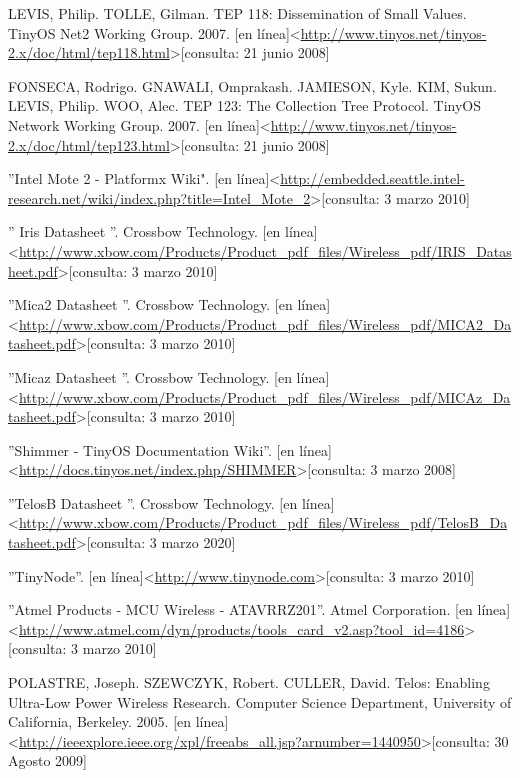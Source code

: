 \begin{thebibliography}{99}
\begin{sloppypar}
 LEVIS, Philip. TOLLE, Gilman. TEP 118: Dissemination of Small Values. TinyOS Net2 Working Group. 2007. 
[en línea]\textless \url{http://www.tinyos.net/tinyos-2.x/doc/html/tep118.html}\textgreater[consulta: 21 junio 2008] 

 FONSECA, Rodrigo. GNAWALI, Omprakash. JAMIESON, Kyle. KIM, Sukun. LEVIS, Philip. WOO, Alec. TEP 123: The Collection Tree Protocol. TinyOS Network Working Group. 2007. [en línea]\textless\url{http://www.tinyos.net/tinyos-2.x/doc/html/tep123.html}\textgreater[consulta: 21 junio 2008] 

 ''Intel Mote 2 - Platformx Wiki". [en línea]\textless\url{http://embedded.seattle.intel-research.net/wiki/index.php?title=Intel_Mote_2}\textgreater[consulta: 3 marzo 2010] 

 '' Iris Datasheet ''. Crossbow Technology. [en línea]\textless\url{http://www.xbow.com/Products/Product_pdf_files/Wireless_pdf/IRIS_Datasheet.pdf}\textgreater[consulta: 3 marzo 2010] 

 ''Mica2 Datasheet ''. Crossbow Technology.
[en línea]\textless\url{http://www.xbow.com/Products/Product_pdf_files/Wireless_pdf/MICA2_Datasheet.pdf}\textgreater[consulta: 3 marzo 2010] 

 ''Micaz Datasheet ''. Crossbow Technology.
[en línea]\textless\url{http://www.xbow.com/Products/Product_pdf_files/Wireless_pdf/MICAz_Datasheet.pdf}\textgreater[consulta: 3 marzo 2010] 

 ''Shimmer - TinyOS Documentation Wiki''.
[en línea]\textless\url{http://docs.tinyos.net/index.php/SHIMMER}\textgreater[consulta: 3 marzo 2008] 

 ''TelosB Datasheet ''. Crossbow Technology.
[en línea]\textless\url{http://www.xbow.com/Products/Product_pdf_files/Wireless_pdf/TelosB_Datasheet.pdf}\textgreater[consulta: 3 marzo 2020] 

 ''TinyNode''.
[en línea]\textless\url{http://www.tinynode.com}\textgreater[consulta: 3 marzo 2010] 

 ''Atmel Products - MCU Wireless - ATAVRRZ201''. Atmel Corporation.
[en línea]\textless\url{http://www.atmel.com/dyn/products/tools_card_v2.asp?tool_id=4186}\textgreater[consulta: 3 marzo 2010] 

 POLASTRE, Joseph. SZEWCZYK, Robert. CULLER, David. Telos: Enabling Ultra-Low Power Wireless Research. Computer Science Department, University of California, Berkeley. 2005. 
[en línea]\textless\url{http://ieeexplore.ieee.org/xpl/freeabs_all.jsp?arnumber=1440950}\textgreater[consulta: 30 Agosto 2009] 


\end{sloppypar}
\end{thebibliography}
